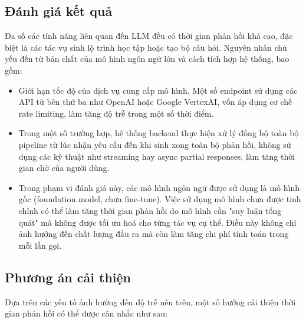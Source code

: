 \subsection{Đánh giá kết quả}
Đa số các tính năng liên quan đến LLM đều có thời gian phản hồi khá cao, đặc biệt là các tác vụ sinh lộ trình học tập hoặc tạo bộ câu hỏi. Nguyên nhân chủ yếu đến từ bản chất của mô hình ngôn ngữ lớn và cách tích hợp hệ thống, bao gồm:

\begin{itemize}
    \item Giới hạn tốc độ của dịch vụ cung cấp mô hình. Một số endpoint sử dụng các API từ bên thứ ba như OpenAI hoặc Google VertexAI, vốn áp dụng cơ chế rate limiting, làm tăng độ trễ trong một số thời điểm.

    \item Trong một số trường hợp, hệ thống backend thực hiện xử lý đồng bộ toàn bộ pipeline từ lúc nhận yêu cầu đến khi sinh xong toàn bộ phản hồi, không sử dụng các kỹ thuật như streaming hay async partial responses, làm tăng thời gian chờ của người dùng.

    \item Trong phạm vi đánh giá này, các mô hình ngôn ngữ được sử dụng là mô hình gốc (foundation model, chưa fine-tune). Việc sử dụng mô hình chưa được tinh chỉnh có thể làm tăng thời gian phản hồi do mô hình cần "suy luận tổng quát" mà không được tối ưu hoá cho từng tác vụ cụ thể. Điều này không chỉ ảnh hưởng đến chất lượng đầu ra mà còn làm tăng chi phí tính toán trong mỗi lần gọi.
\end{itemize}

\subsection{Phương án cải thiện}

Dựa trên các yếu tố ảnh hưởng đến độ trễ nêu trên, một số hướng cải thiện thời gian phản hồi có thể được cân nhắc như sau:

